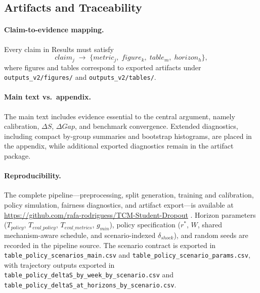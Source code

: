 \subsection{Artifacts and Traceability}
\label{subsec:artifacts}



\paragraph*{Claim-to-evidence mapping.}
Every claim in Results must satisfy
\begin{equation*}
claim_j \;\rightarrow\; \{metric_j,\; figure_k,\; table_m,\; horizon_h\},
\end{equation*}
where figures and tables correspond to exported artifacts under \texttt{outputs\_v2/figures/} and \texttt{outputs\_v2/tables/}.

\paragraph*{Main text vs.\ appendix.}
The main text includes evidence essential to the central argument, namely calibration, $\Delta S$, $\Delta Gap$, and benchmark convergence. Extended diagnostics, including compact by-group summaries and bootstrap histograms, are placed in the appendix, while additional exported diagnostics remain in the artifact package.

\paragraph*{Reproducibility.}
The complete pipeline---preprocessing, split generation, training and calibration, policy simulation, fairness diagnostics, and artifact export---is available at
\url{https://github.com/rafa-rodriguess/TCM-Student-Dropout}
\cite{RafaRepoTCMStudentDropout}. Horizon parameters ($T_{policy}$, $T_{eval\_policy}$, $T_{eval\_metrics}$, $g_{min}$), policy specification ($r^*$, $W$, shared mechanism-aware schedule, and scenario-indexed $\delta_{shock}$), and random seeds are recorded in the pipeline source. The scenario contract is exported in \nolinkurl{table_policy_scenarios_main.csv} and \nolinkurl{table_policy_scenario_params.csv}, with trajectory outputs exported in \nolinkurl{table_policy_deltaS_by_week_by_scenario.csv} and \nolinkurl{table_policy_deltaS_at_horizons_by_scenario.csv}.

